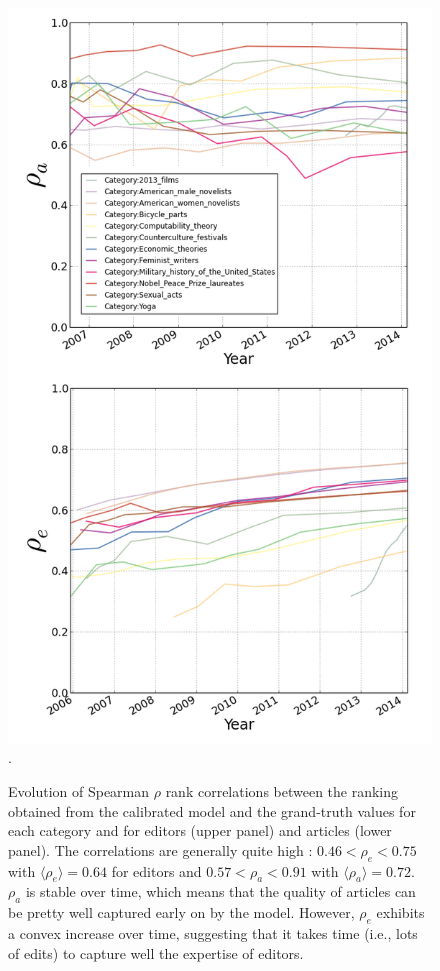 \begin{figure}[!t]
 \centering
\includegraphics[width=0.9\columnwidth]{Figures/rho_combined.png}.
\caption{Evolution of Spearman $\rho$ rank correlations between the ranking obtained from the calibrated model and the grand-truth values for each category and for editors (upper panel)  and articles (lower panel). The correlations are generally quite high : $ 0.46 < \rho_e < 0.75$ with $\langle \rho_e\rangle = 0.64$ for editors and $0.57 < \rho_a < 0.91$ with $\langle \rho_a\rangle = 0.72$. $\rho_{a}$  is stable over time, which means that the quality of articles can be pretty well captured early on by the model. However, $\rho_e$ exhibits a convex increase over time, suggesting that it takes time (i.e., lots of edits) to capture well the expertise of editors.}
 \label{fig:rhotime}
 \end{figure}



